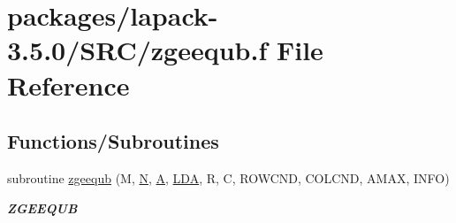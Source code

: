 \hypertarget{zgeequb_8f}{}\section{packages/lapack-\/3.5.0/\+S\+R\+C/zgeequb.f File Reference}
\label{zgeequb_8f}
\subsection*{Functions/\+Subroutines}
\begin{DoxyCompactItemize}
\item 
subroutine \hyperlink{group__complex16GEcomputational_ga3149551bfd0d41e7e8125a2d26d6c017}{zgeequb} (M, \hyperlink{polmisc_8c_a0240ac851181b84ac374872dc5434ee4}{N}, \hyperlink{classA}{A}, \hyperlink{example__user_8c_ae946da542ce0db94dced19b2ecefd1aa}{L\+D\+A}, R, C, R\+O\+W\+C\+N\+D, C\+O\+L\+C\+N\+D, A\+M\+A\+X, I\+N\+F\+O)
\begin{DoxyCompactList}\small\item\em {\bfseries Z\+G\+E\+E\+Q\+U\+B} \end{DoxyCompactList}\end{DoxyCompactItemize}

